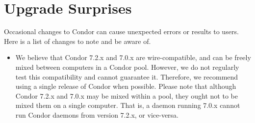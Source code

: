 \section{\label{sec:gotchas}Upgrade Surprises}

Occasional changes to Condor can cause unexpected errors or results
to users.
Here is a list of changes to note and be aware of.

\begin{itemize}

\item 
We believe that Condor 7.2.x and 7.0.x are wire-compatible,
and can be freely mixed between computers in a Condor pool. 
However, we do not regularly test this compatibility and cannot guarantee it. 
Therefore, we recommend using a single release of Condor when possible. 
Please note that although Condor 7.2.x and 7.0.x may be mixed within a pool, 
they ought not to be mixed them on a single computer. 
That is, a  daemon running 7.0.x cannot run Condor daemons 
from version 7.2.x, or vice-versa.






\end{itemize}

